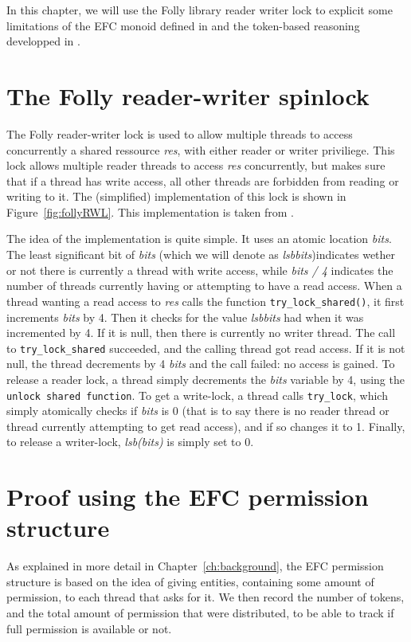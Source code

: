 In this chapter, we will use the Folly library reader writer lock \cite{follyRW} to explicit some limitations of the EFC monoid defined in \cite{gaurav} and the token-based reasoning developped in \cite{pascal}.

\section{The Folly reader-writer spinlock}
The Folly reader-writer lock is used to allow multiple threads to access concurrently a shared ressource \emph{res}, with either reader or writer priviliege. This lock allows multiple reader threads to access \emph{res} concurrently, but makes sure that if a thread has write access, all other threads are forbidden from reading or writing to it. The (simplified) implementation of this lock is shown in Figure~\ref{fig:follyRWL}. This implementation is taken from \cite{Gaurav}.

The idea of the implementation is quite simple. It uses an atomic location \emph{bits}. The least significant bit of \emph{bits} (which we will denote as \emph{lsb{bits}})indicates wether or not there is currently a thread with write access, while \emph{bits / 4} indicates the number of threads currently having or attempting to have a read access. When a thread wanting a read access to \emph{res} calls the function \texttt{try\_lock\_shared()}, it first increments \emph{bits} by 4. Then it checks for the value \emph{lsb{bits}} had when it was incremented by 4. If it is null, then there is currently no writer thread. The call to \texttt{try\_lock\_shared} succeeded, and the calling thread got read access. If it is not null, the thread decrements by 4 \emph{bits} and the call failed: no access is gained. To release a reader lock, a thread simply decrements the \emph{bits} variable by 4, using the \texttt{unlock shared function}. To get a write-lock, a thread calls \texttt{try\_lock}, which simply atomically checks if \emph{bits} is 0 (that is to say there is no reader thread or thread currently attempting to get read access), and if so changes it to 1. Finally, to release a writer-lock, \emph{lsb(bits)} is simply set to 0.

\section{Proof using the EFC permission structure}
As explained in more detail in Chapter~\ref{ch:background}, the EFC permission structure is based on the idea of giving entities, containing some amount of permission, to each thread that asks for it. We then record the number of tokens, and the total amount of permission that were distributed, to be able to track if full permission is available or not. 

